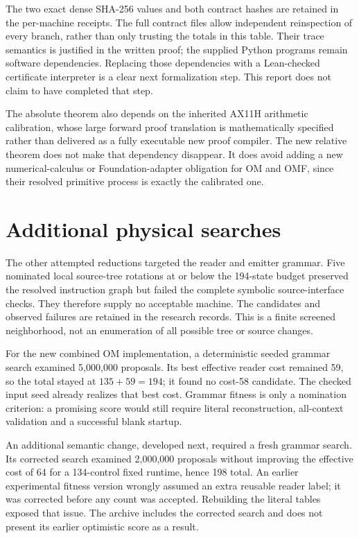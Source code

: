 \documentclass[11pt,a4paper]{article}
\begin{document}
The two exact dense SHA-256 values and both contract hashes are retained
in the per-machine receipts. The full contract files allow independent
reinspection of every branch, rather than only trusting the totals in this
table. Their trace semantics is justified in the written proof; the supplied
Python programs remain software dependencies. Replacing those dependencies
with a Lean-checked certificate interpreter is a clear next formalization
step. This report does not claim to have completed that step.

The absolute theorem also depends on the inherited AX11H arithmetic
calibration, whose large forward proof translation is mathematically
specified rather than delivered as a fully executable new proof compiler.
The new relative theorem does not make that dependency disappear. It does
avoid adding a new numerical-calculus or Foundation-adapter obligation for
OM and OMF, since their resolved primitive process is exactly the calibrated
one.



\section{Additional physical searches}

The other attempted reductions targeted the reader and emitter grammar.
Five nominated local source-tree rotations at or below the 194-state budget
preserved the resolved instruction graph but failed the complete symbolic
source-interface checks. They therefore supply no acceptable machine.
The candidates and observed failures are retained in the research records.
This is a finite screened neighborhood, not an enumeration of all possible
tree or source changes.

For the new combined OM implementation, a deterministic seeded grammar
search examined 5,000,000 proposals. Its best effective reader cost remained
59, so the total stayed at $135+59=194$; it found no cost-58 candidate.
The checked input seed already realizes that best cost. Grammar fitness is
only a nomination criterion: a promising score would still require literal
reconstruction, all-context validation and a successful blank startup.

An additional semantic change, developed next, required a fresh grammar
search. Its corrected search examined 2,000,000 proposals without improving
the effective cost of 64 for a 134-control fixed runtime, hence 198 total.
An earlier experimental fitness version wrongly assumed an extra reusable
reader label; it was corrected before any count was accepted. Rebuilding
the literal tables exposed that issue. The archive includes the corrected
search and does not present its earlier optimistic score as a result.
\end{document}

